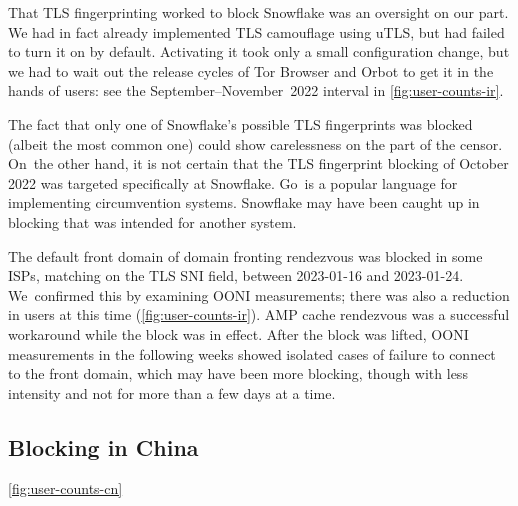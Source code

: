 \documentclass[letterpaper,twocolumn]{article}
\begin{document}
That TLS fingerprinting worked to block Snowflake
was an oversight on our part.
We had in fact already implemented TLS camouflage using uTLS,
but had failed to turn it on by default.
Activating it took only a small configuration change,
but we had to wait out the release cycles of Tor Browser and Orbot
to get it in the hands of users:
see the September--November~2022 interval in \autoref{fig:user-counts-ir}.

The fact that only one of Snowflake's possible TLS fingerprints was blocked
(albeit the most common one)
could show carelessness on the part of the censor.
On~the other hand, it is not certain that the TLS fingerprint blocking of October 2022
was targeted specifically at Snowflake.
Go~is a popular language for implementing circumvention systems.
Snowflake may have been caught up in blocking that was intended for another system.


The default front domain of domain fronting rendezvous
was blocked in some ISPs, matching on the TLS SNI field,
between \mbox{2023-01-16} and \mbox{2023-01-24}.
We~confirmed this by examining OONI measurements;
there was also a reduction in users at this time (\autoref{fig:user-counts-ir}).
AMP cache rendezvous was a successful workaround while the block was in effect.
After the block was lifted,
OONI measurements in the following weeks showed isolated cases
of failure to connect to the front domain,
which may have been more blocking,
though with less intensity and not for more than a few days at a time.

\subsection{Blocking in China}
\label{sec:block-cn}


\autoref{fig:user-counts-cn}
\end{document}
